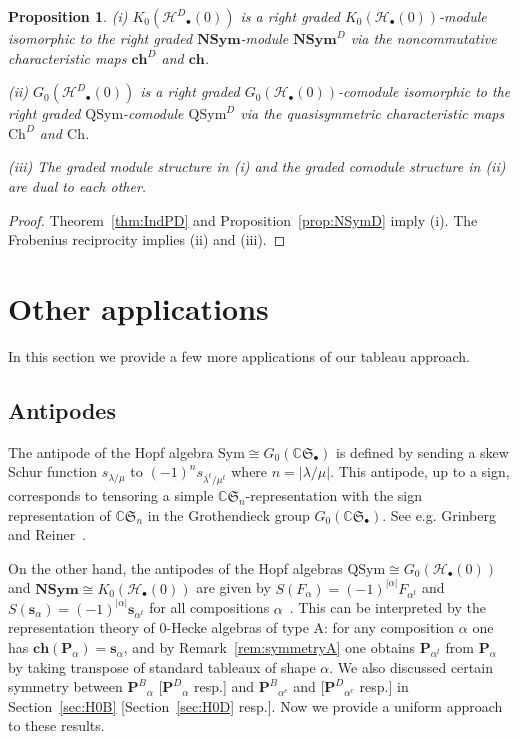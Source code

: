 \documentclass{amsart}
\newtheorem{proposition}[theorem]{Proposition}
\newtheorem*{Young's Rule}{Young's Rule}
\theoremstyle{definition}
\theoremstyle{remark}
\numberwithin{equation}{section}
\begin{document}
\begin{proposition}
(i) $K_0({\mathcal{H}^D}_\bullet(0))$ is a right graded $K_0({\mathcal{H}}_\bullet(0))$-module isomorphic to the right graded ${\mathbf{NSym}}$-module ${\mathbf{NSym}}^D$ via the noncommutative characteristic maps $\mathbf{ch}^D$ and $\mathbf{ch}$.

\noindent (ii) $G_0({\mathcal{H}^D}_\bullet(0))$ is a right graded $G_0({\mathcal{H}}_\bullet(0))$-comodule isomorphic to the right graded ${\mathrm{QSym}}$-comodule ${\mathrm{QSym}}^D$ via the quasisymmetric characteristic maps $\mathrm{Ch}^D$ and $\mathrm{Ch}$.

\noindent(iii) The graded module structure in (i) and the graded comodule structure in (ii) are dual to each other.
\end{proposition}

\begin{proof}
Theorem~\ref{thm:IndPD} and Proposition~\ref{prop:NSymD} imply (i). The Frobenius reciprocity implies (ii) and (iii).
\end{proof}

\section{Other applications}\label{sec:other}

In this section we provide a few more applications of our tableau approach.

\subsection{Antipodes}\label{sec:antipodes}

The antipode of the Hopf algebra ${\mathrm{Sym}} \cong G_0({{\mathbb C}}{{\mathfrak S}}_\bullet)$ is defined by sending a skew Schur function $s_{\lambda/\mu}$ to $(-1)^n s_{\lambda^t/\mu^t}$ where $n=|\lambda/\mu|$. This antipode, up to a sign, corresponds to tensoring a simple ${{\mathbb C}}{{\mathfrak S}}_n$-representation with the sign representation of ${{\mathbb C}}{{\mathfrak S}}_n$ in the Grothendieck group $G_0({{\mathbb C}}{{\mathfrak S}}_\bullet)$. See e.g. Grinberg and Reiner~\cite[\S2.4, \S4.4]{GrinbergReiner}.

On the other hand, the antipodes of the Hopf algebras ${\mathrm{QSym}}\cong G_0({\mathcal{H}}_\bullet(0))$ and ${\mathbf{NSym}} \cong K_0({\mathcal{H}}_\bullet(0))$ are given by $S(F_\alpha)=(-1)^{|\alpha|}F_{\alpha^t}$ and $S({{\mathbf s}}_\alpha)=(-1)^{|\alpha|}{{\mathbf s}}_{\alpha^t}$ for all compositions $\alpha$~\cite[(5.9), (5.21)]{GrinbergReiner}. This can be interpreted by the representation theory of 0-Hecke algebras of type A: for any composition $\alpha$ one has $\mathbf{ch}({\mathbf{P}}_\alpha)={{\mathbf s}}_\alpha$, and  by Remark~\ref{rem:symmetryA} one obtains ${\mathbf{P}}_{\alpha^t}$ from ${\mathbf{P}}_{\alpha}$ by taking transpose of standard tableaux of shape $\alpha$. We also discussed certain symmetry between ${\mathbf{P}^B}_\alpha$ [${\mathbf{P}^D}_\alpha$ resp.] and ${\mathbf{P}^B}_{\alpha^c}$ and [${\mathbf{P}^D}_{\alpha^c}$ resp.] in Section~\ref{sec:H0B} [Section~\ref{sec:H0D} resp.]. Now we provide a uniform approach to these results.
\end{document}
